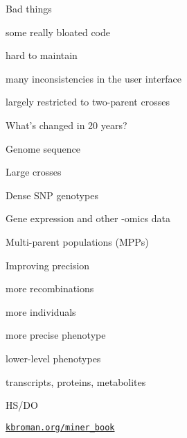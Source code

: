 \documentclass[12pt,t,aspectratio=169]{beamer}
\begin{document}
\begin{frame}{Bad things}

  \bbi
\item some really bloated code
\item hard to maintain
\item many inconsistencies in the user interface
\item largely restricted to two-parent crosses
  \ei

\end{frame}






\begin{frame}{What's changed in 20 years?}

  \bbi
\item Genome sequence
\item Large crosses
\item Dense SNP genotypes
\item Gene expression and other -omics data
\item Multi-parent populations (MPPs)
  \ei

\end{frame}



\begin{frame}{Improving precision}

  \bbi
\item more recombinations
\item more individuals
\item more precise phenotype
\item lower-level phenotypes
\bi
\item transcripts, proteins, metabolites
  \ei
  \ei

\end{frame}



\begin{frame}[c]{HS/DO}

  \vspace{2mm}


\end{frame}





\begin{frame}[c]{}

  \vspace*{5mm}



\vspace{3mm}

\hfill \href{https://kbroman.org/miner_book}{\scriptsize \lolit \tt kbroman.org/miner\_book}

\end{frame}
\end{document}
